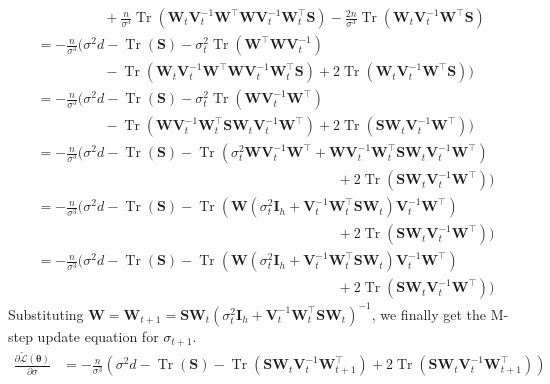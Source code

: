 \documentclass[11pt]{article}
\DeclareMathOperator{\tr}{Tr}
\begin{document}
\begin{enumerate}
\begin{enumerate}
\begin{align*}
    &\hspace{2cm} +\frac{n}{\sigma^3}\tr\left(\bm W_t\bm V_t^{-1}\bm W^{\top}\bm W\bm V_t^{-1}\bm W_t^{\top}\bm S\right)-\frac{2n}{\sigma^3}\tr\left(\bm W_t\bm V_t^{-1}\bm W^{\top}\bm S\right) \\
    &= -\frac{n}{\sigma^3}\bigg(\sigma^2d-\tr\left(\bm S\right)-\sigma_t^2\tr\left(\bm W^{\top}\bm W\bm V_t^{-1}\right) \\
    &\hspace{2cm} -\tr\left(\bm W_t\bm V_t^{-1}\bm W^{\top}\bm W\bm V_t^{-1}\bm W_t^{\top}\bm S\right)+2\tr\left(\bm W_t\bm V_t^{-1}\bm W^{\top}\bm S\right)\bigg) \\
    &= -\frac{n}{\sigma^3}\bigg(\sigma^2d-\tr\left(\bm S\right)-\sigma_t^2\tr\left(\bm W\bm V_t^{-1}\bm W^{\top}\right) \\
    &\hspace{2cm} -\tr\left(\bm W\bm V_t^{-1}\bm W_t^{\top}\bm S\bm W_t\bm V_t^{-1}\bm W^{\top}\right)+2\tr\left(\bm S\bm W_t\bm V_t^{-1}\bm W^{\top}\right)\bigg) \\
    &= -\frac{n}{\sigma^3}\bigg(\sigma^2d-\tr\left(\bm S\right)-\tr\left(\sigma_t^2\bm W\bm V_t^{-1}\bm W^{\top}+\bm W\bm V_t^{-1}\bm W_t^{\top}\bm S\bm W_t\bm V_t^{-1}\bm W^{\top}\right) \\
    &\hspace{9cm} +2\tr\left(\bm S\bm W_t\bm V_t^{-1}\bm W^{\top}\right)\bigg) \\
    &= -\frac{n}{\sigma^3}\bigg(\sigma^2d-\tr\left(\bm S\right)-\tr\left(\bm W\left(\sigma_t^2\bm I_h+\bm V_t^{-1}\bm W_t^{\top}\bm S\bm W_t\right)\bm V_t^{-1}\bm W^{\top}\right) \\
    &\hspace{9cm} +2\tr\left(\bm S\bm W_t\bm V_t^{-1}\bm W^{\top}\right)\bigg) \\
    &= -\frac{n}{\sigma^3}\bigg(\sigma^2d-\tr\left(\bm S\right)-\tr\left(\bm W\left(\sigma_t^2\bm I_h+\bm V_t^{-1}\bm W_t^{\top}\bm S\bm W_t\right)\bm V_t^{-1}\bm W^{\top}\right) \\
    &\hspace{9cm} +2\tr\left(\bm S\bm W_t\bm V_t^{-1}\bm W^{\top}\right)\bigg)
    \end{align*}
    Substituting $\bm W=\bm W_{t+1}=\bm S\bm W_t\left(\sigma_t^2\bm I_h+\bm V_t^{-1}\bm W_t^{\top}\bm S\bm W_t\right)^{-1}$, we finally get the M-step update equation for $\sigma_{t+1}$.
    \begin{align*}
    \frac{\partial\tilde{\mathcal{L}}(\bm\theta)}{\partial\sigma}
    &= -\frac{n}{\sigma^3}\left(\sigma^2d-\tr\left(\bm S\right)-\tr\left(\bm S\bm W_t\bm V_t^{-1}\bm W_{t+1}^{\top}\right)+2\tr\left(\bm S\bm W_t\bm V_t^{-1}\bm W_{t+1}^{\top}\right)\right) \\

\end{align*}
\end{enumerate}
\end{enumerate}
\end{document}
